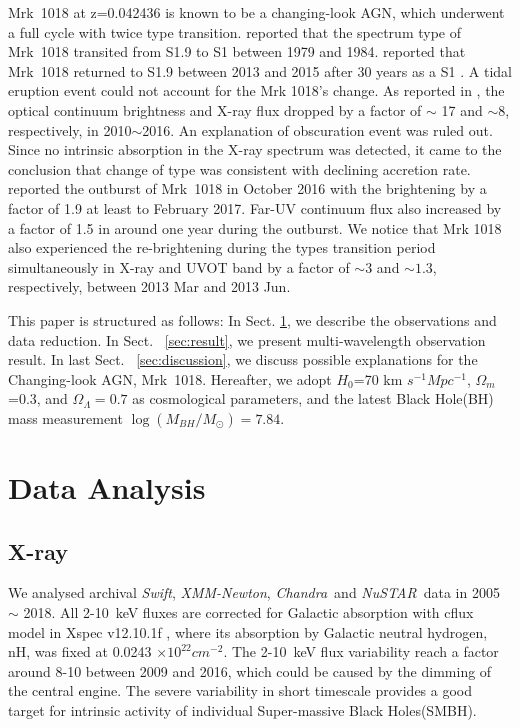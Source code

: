 \documentclass{aastex63}
\newcommand{\xmm}{{\em XMM-Newton}}
\newcommand{\nustar}{{\em NuSTAR}}
\newcommand{\chandra}{{\em Chandra}}
\newcommand{\swift}{{\em Swift}}
\begin{document}
Mrk~1018 at z=0.042436 is known to be a changing-look AGN, which underwent a full cycle with twice type transition.
\citet{1986ApJ...311..135C} reported that the spectrum type of Mrk~1018 transited from S1.9 to S1 between 1979 and 1984. \citet{2016A&A...593L...8M} reported that Mrk~1018 returned to S1.9 between 2013 and 2015 after 30 years as a S1 \citep[see also][]{2017A&A...607L...9K}. A tidal eruption event could not account for the Mrk 1018's change. As reported in \citet{2016A&A...593L...9H}, the optical continuum brightness and X-ray flux dropped by a factor of $\sim$ 17 and $\sim 8$, respectively, in 2010$\sim$2016. An explanation of obscuration event was ruled out. Since no intrinsic absorption in the X-ray spectrum was detected, it came to the conclusion that change of type was consistent with declining accretion rate. \citet{2017A&A...607L...9K} reported the outburst of Mrk~1018 in October 2016 with the brightening by a factor of 1.9 at least to February 2017. Far-UV continuum flux also increased by a factor of 1.5 in around one year during the outburst. We notice that Mrk 1018 also experienced the re-brightening during the types transition period simultaneously in X-ray and UVOT band by a factor of $\sim3$ and $\sim1.3$, respectively, between 2013 Mar and 2013 Jun.  

This paper is structured as follows: In Sect. \ref{sec:data}, we describe the observations and data reduction. In Sect. ~\ref{sec:result}, we present multi-wavelength observation result. In last Sect. ~\ref{sec:discussion}, we discuss possible explanations for the Changing-look AGN, Mrk~1018. Hereafter, we adopt $H_0$=70 km $s^{-1} Mpc^{-1}$, $\Omega_{m}$=0.3, and $\Omega_{\Lambda}=0.7 $ as cosmological parameters, and the latest Black Hole(BH) mass measurement $\log(M_{BH}/M_{\odot})=7.84$\citep{2017MNRAS.472.3492E,2018MNRAS.480.3898N}. 
\clearpage


\section{Data Analysis}\label{sec:data}
\subsection{X-ray}
We analysed archival \swift, \xmm, \chandra~and \nustar~data in 2005 $\sim$ 2018. All 2-10~keV fluxes are corrected for Galactic absorption with cflux model in Xspec v12.10.1f \citep{1996ASPC..101...17A}, where its absorption by Galactic neutral hydrogen, nH, was fixed at 0.0243 $\times10^{22} cm^{-2}$\citep[see ][]{2016A&A...593L...9H}. The 2-10~keV flux variability reach a factor around 8-10 between 2009 and 2016, which could be caused by the dimming of the central engine. The severe variability in short timescale provides a good target for intrinsic activity of individual Super-massive Black Holes(SMBH).
\end{document}

